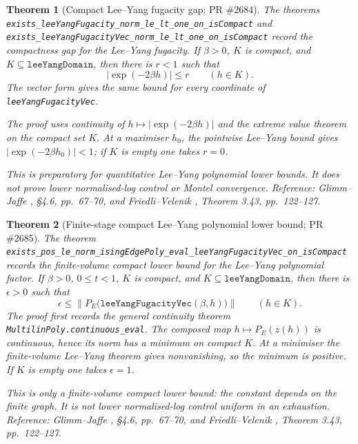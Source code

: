 \documentclass[a4paper,11pt]{article}
\newtheorem{theorem}{Theorem}
\begin{document}
\begin{theorem}[Compact Lee--Yang fugacity gap; PR \#2684]
The theorems
\texttt{exists\_leeYangFugacity\_norm\_le\_lt\_one\_on\_isCompact}
and
\texttt{exists\_leeYangFugacityVec\_norm\_le\_lt\_one\_on\_isCompact}
record the compactness gap for the Lee--Yang fugacity.  If $\beta>0$,
$K$ is compact, and $K\subseteq\texttt{leeYangDomain}$, then there is
$r<1$ such that
\[
  |\exp(-2\beta h)|\le r \qquad(h\in K).
\]
The vector form gives the same bound for every coordinate of
\texttt{leeYangFugacityVec}.

The proof uses continuity of $h\mapsto |\exp(-2\beta h)|$ and the extreme
value theorem on the compact set $K$.  At a maximiser $h_0$, the pointwise
Lee--Yang bound gives $|\exp(-2\beta h_0)|<1$; if $K$ is empty one takes
$r=0$.

This is preparatory for quantitative Lee--Yang polynomial lower bounds.
It does not prove lower normalised-log control or Montel convergence.
Reference: Glimm--Jaffe \cite{glimm-jaffe}, \S 4.6, pp.~67--70, and
Friedli--Velenik \cite{friedli-velenik}, Theorem 3.43, pp.~122--127.
\end{theorem}

\begin{theorem}[Finite-stage compact Lee--Yang polynomial lower bound; PR \#2685]
The theorem
\texttt{exists\_pos\_le\_norm\_isingEdgePoly\_eval\_leeYangFugacityVec\_on\_isCompact}
records the finite-volume compact lower bound for the Lee--Yang polynomial
factor.  If $\beta>0$, $0\le t<1$, $K$ is compact, and
$K\subseteq\texttt{leeYangDomain}$, then there is $\epsilon>0$ such that
\[
  \epsilon \le
  \left\|P_E\bigl(\texttt{leeYangFugacityVec}(\beta,h)\bigr)\right\|
  \qquad(h\in K).
\]
The proof first records the general continuity theorem
\texttt{MultilinPoly.continuous\_eval}.  The composed map
$h\mapsto P_E(z(h))$ is continuous, hence its norm has a minimum on compact
$K$.  At a minimiser the finite-volume Lee--Yang theorem gives nonvanishing,
so the minimum is positive.  If $K$ is empty one takes $\epsilon=1$.

This is only a finite-volume compact lower bound: the constant depends on the
finite graph.  It is not lower normalised-log control uniform in an exhaustion.
Reference: Glimm--Jaffe \cite{glimm-jaffe}, \S 4.6, pp.~67--70, and
Friedli--Velenik \cite{friedli-velenik}, Theorem 3.43, pp.~122--127.
\end{theorem}
\end{document}
